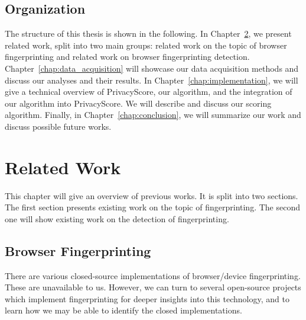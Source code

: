\documentclass[
    fontsize=12pt,
    headings=small,
    parskip=half,
    bibliography=totoc,
    numbers=noenddot,
    open=any
    ]{scrreprt}
\begin{document}
\section{Organization}
The structure of this thesis is shown in the following.
In Chapter~\ref{chap:related_work}, we present related work, split into two main groups:
related work on the topic of browser fingerprinting and related work on
browser fingerprinting detection.
Chapter~\ref{chap:data_acquisition} will showcase our data acquisition
methods and discuss our analyses and their results.
In Chapter~\ref{chap:implementation}, we will give a technical overview of PrivacyScore,
our algorithm, and the integration of our algorithm into PrivacyScore.
We will describe and discuss our scoring algorithm.
Finally, in Chapter~\ref{chap:conclusion}, we will summarize our work and discuss possible future works.




\chapter{Related Work}
\label{chap:related_work}
This chapter will give an overview of previous works. It is split into two sections.
The first section presents existing work on the topic of fingerprinting. The second one will show existing work on
the detection of fingerprinting.

\section{Browser Fingerprinting}
There are various closed-source implementations of browser/device fingerprinting. These are unavailable to us.
However, we can turn to several open-source projects which implement fingerprinting for deeper insights into this technology,
and to learn how we may be able to identify the closed implementations.
\end{document}
